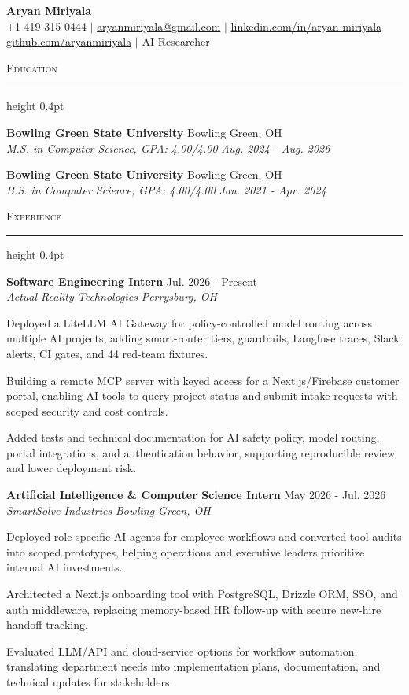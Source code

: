 \documentclass[letterpaper,11pt]{article}
\newcommand{\resumesection}[1]{%
  \par\vspace{2pt}%
  {\large\scshape #1}\par\vspace{2pt}%
  \hrule height 0.4pt\vspace{2pt}%
}
\newcommand{\resumeSubheading}[4]{
  \textbf{#1} \hfill #2\\
  \textit{#3} \hfill \textit{#4}
}
\begin{document}
\begin{center}
  {\LARGE \textbf{Aryan Miriyala}}\\[2pt]
  \small
  +1 419-315-0444 $|$ \href{mailto:aryanmiriyala@gmail.com}{aryanmiriyala@gmail.com} $|$ \href{https://www.linkedin.com/in/aryan-miriyala-7788a21b6/}{linkedin.com/in/aryan-miriyala}\\
  \href{https://github.com/aryanmiriyala}{github.com/aryanmiriyala} $|$ AI Researcher
\end{center}\vspace{-6pt}

\resumesection{Education}
\resumeSubheading
{Bowling Green State University}{Bowling Green, OH}
{M.S. in Computer Science, GPA: 4.00/4.00}{Aug. 2024 - Aug. 2026}

\resumeSubheading
{Bowling Green State University}{Bowling Green, OH}
{B.S. in Computer Science, GPA: 4.00/4.00}{Jan. 2021 - Apr. 2024}

\resumesection{Experience}
\resumeSubheading
{Software Engineering Intern}{Jul. 2026 - Present}
{Actual Reality Technologies}{Perrysburg, OH}
\begin{tightitemize}
  \item Deployed a LiteLLM AI Gateway for policy-controlled model routing across multiple AI projects, adding smart-router tiers, guardrails, Langfuse traces, Slack alerts, CI gates, and 44 red-team fixtures.
  \item Building a remote MCP server with keyed access for a Next.js/Firebase customer portal, enabling AI tools to query project status and submit intake requests with scoped security and cost controls.
  \item Added tests and technical documentation for AI safety policy, model routing, portal integrations, and authentication behavior, supporting reproducible review and lower deployment risk.
\end{tightitemize}

\resumeSubheading
{Artificial Intelligence \& Computer Science Intern}{May 2026 - Jul. 2026}
{SmartSolve Industries}{Bowling Green, OH}
\begin{tightitemize}
  \item Deployed role-specific AI agents for employee workflows and converted tool audits into scoped prototypes, helping operations and executive leaders prioritize internal AI investments.
  \item Architected a Next.js onboarding tool with PostgreSQL, Drizzle ORM, SSO, and auth middleware, replacing memory-based HR follow-up with secure new-hire handoff tracking.
  \item Evaluated LLM/API and cloud-service options for workflow automation, translating department needs into implementation plans, documentation, and technical updates for stakeholders.
\end{tightitemize}
\end{document}
